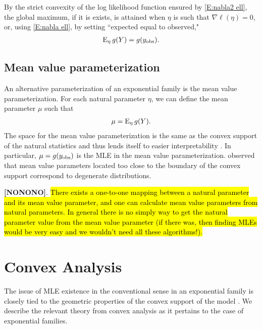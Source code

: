 By the strict convexity of the log likelihood function ensured by \eqref{E:nabla2 
ell}, the global 
maximum, if it is exists, is attained when $\eta$ is such that $\nabla \ell( \eta ) = 
0$, or, using \eqref{E:nabla ell}, by setting ``expected equal to observed,"
\begin{align}
	\operatorname{E}_\eta g(Y) = g(y_{\textrm{obs}}). \label{E:Observed-Expected}
\end{align}



\subsection{Mean value parameterization}

An alternative parameterization of an exponential family is the mean value 
parameterization.  For each natural parameter $\eta$, we can define the mean parameter 
$\mu$ such that
\begin{align*}
	\mu = \operatorname{E}_\eta g(Y).
\end{align*}
The space for the mean value parameterization is the same as the convex support of the 
natural statistics and thus lends itself to easier interpretability  \citep
{Handcock:degeneracy, Rinaldo:2009}.  In particular, $\mu = g(y_{\textrm{obs}})$ is the MLE in 
the mean value parameterization.  \citeauthor{Handcock:degeneracy} observed that mean 
value parameters located too close to the boundary of the convex support correspond to 
degenerate distributions.  

\textbf{[NONONO]}. \hl{ There exists a one-to-one mapping between a natural parameter and its mean value 
parameter, and one can calculate mean value parameters from natural parameters. In 
general there is no simply way to get the natural parameter value from the mean value 
parameter (if there was, then finding MLEs would be very easy and we wouldn't need all 
these algorithms!).}



\section{Convex Analysis}
The issue of MLE existence in the conventional sense in an exponential family is 
closely tied to the geometric properties of 
the convex support of the model \citep{Barndorff, Geyer:gdor, Rinaldo:2009}.  We 
describe the relevant theory from convex analysis as it pertains to the case of 
exponential families.

